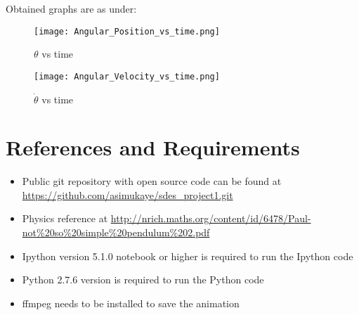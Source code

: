 \documentclass[12pt, a4paper]{report}
\begin{document}
Obtained graphs are as under:

\begin{figure}[H]
\label{position}
\texttt{[image: Angular\_Position\_vs\_time.png]}
\caption{$\theta$ vs time}
\end{figure}

\begin{figure}[H]
\label{velocity}
\texttt{[image: Angular\_Velocity\_vs\_time.png]}
\caption{$\dot{\theta}$ vs time}
\end{figure}

\section*{References and Requirements}
\begin{itemize}
\item Public git repository with open source code can be found at \url{https://github.com/asimukaye/sdes_project1.git}
\item Physics reference at \url{http://nrich.maths.org/content/id/6478/Paul-not%20so%20simple%20pendulum%202.pdf}
\item Ipython version 5.1.0 notebook or higher is required to run the Ipython code
\item Python 2.7.6 version is required to run the Python code
\item ffmpeg needs to be installed to save the animation

\end{itemize}
\end{document}
